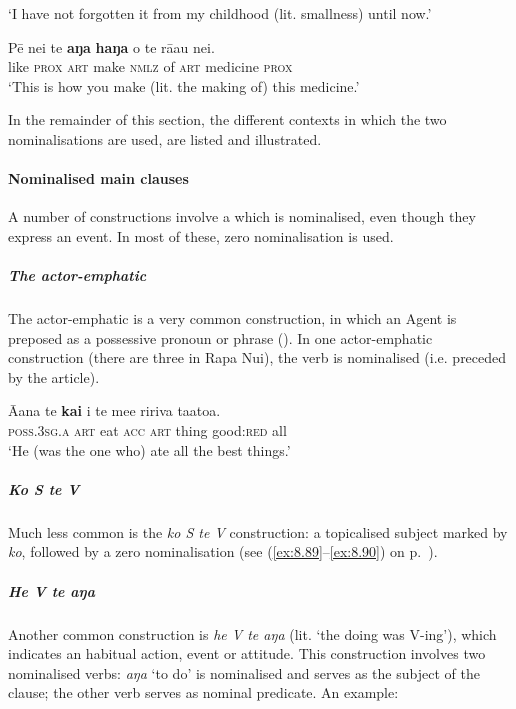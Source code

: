 \glt 
‘I have not forgotten it from my childhood (lit. smallness) until now.’ \textstyleExampleref{[R416.936]} 
\z

\ea\label{ex:3.21}
\gll Pē nei te \textbf{aŋa} \textbf{haŋa} o te rā{\ꞌ}au nei.\\
like \textsc{prox} \textsc{art} make \textsc{nmlz} of \textsc{art} medicine \textsc{prox}\\

\glt 
‘This is how you make (lit. the making of) this medicine.’ \textstyleExampleref{[R313.159]} 
\z

In the remainder of this section, the different contexts in which the two nominalisations are used, are listed and illustrated.

\paragraph{Nominalised main clauses}\label{sec:3.2.3.1.1} A number of constructions involve a  which is nominalised, even though they express an event. In most of these, zero nominalisation is used.

\subparagraph{The actor-emphatic} The actor-emphatic is a very common construction, in which an Agent is preposed as a possessive pronoun or phrase (). In one actor-emphatic construction (there are three in Rapa Nui), the verb is nominalised (i.e. preceded by the article). 

\ea\label{ex:3.22}
\gll {\ꞌ}Ā{\ꞌ}ana te \textbf{kai} i te me{\ꞌ}e ririva ta{\ꞌ}ato{\ꞌ}a. \\
\textsc{poss.3sg.a} \textsc{art} eat \textsc{acc} \textsc{art} thing good:\textsc{red} all \\

\glt
‘He (was the one who) ate all the best things.’ \textstyleExampleref{[R532-01.011]}
\z

\subparagraph{\textit{Ko S te V}} Much less common is the \textit{ko S te V} construction: a topicalised subject marked by \textit{ko}, followed by a zero nominalisation (see (\ref{ex:8.89}–\ref{ex:8.90}) on p.~\pageref{ex:8.89}).

\subparagraph{\textit{He V te aŋa}} Another common construction is \textit{he V te aŋa} (lit. ‘the doing was V-ing’), which indicates an habitual action, event or attitude. This construction involves two nominalised verbs: \textit{aŋa} ‘to do’ is nominalised and serves as the subject of the clause; the other verb serves as nominal predicate. An example:

